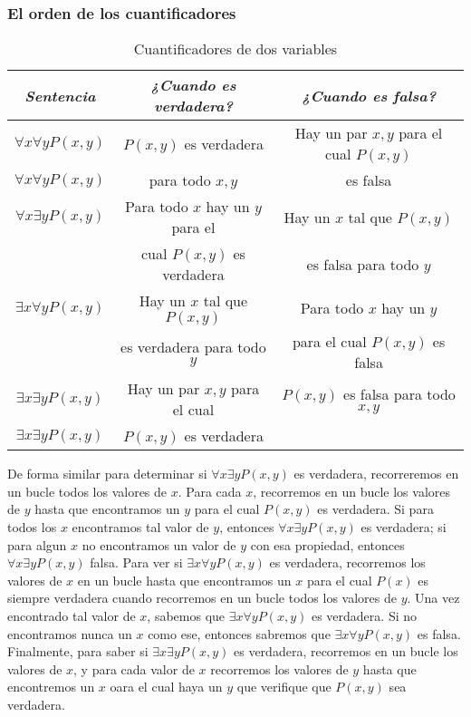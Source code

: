 \documentclass[]{article}
\begin{document}
\subsubsection{El orden de los cuantificadores}

\begin{table}[H]
	\caption*{Cuantificadores de dos variables}
	\begin{center}
		\begin{tabular}{|c|c|c|}
			\hline
			\textit{Sentencia} & \textit{¿Cuando es verdadera?} & \textit{¿Cuando es falsa?}\\
			\hline
			$\forall{x}\forall{y}P(x, y)$ & $P(x, y)$ es verdadera & Hay un par $x, y$ para el cual $P(x, y)$\\
			$\forall{x}\forall{y}P(x, y)$ & para todo $x, y$ & es falsa\\
			\hline
			$\forall{x}\exists{y}P(x, y)$ & Para todo $x$ hay un $y$ para el & Hay un $x$ tal que $P(x, y)$ \\
			 & cual $P(x, y)$ es verdadera & es falsa para todo $y$ \\
			\hline
			$\exists{x}\forall{y}P(x, y)$ & Hay un $x$ tal que $P(x, y)$ & Para todo $x$ hay un $y$ \\
			 & es verdadera para todo $y$ & para el cual  $P(x, y)$ es falsa \\
			\hline
			$\exists{x}\exists{y}P(x, y)$ & Hay un par $x, y$ para el cual & $P(x, y)$ es falsa para todo $x, y$\\
			$\exists{x}\exists{y}P(x, y)$ & $P(x, y)$ es verdadera &  \\
			\hline
		\end{tabular}
	\end{center}
\end{table}

De forma similar para determinar si $\forall{x}\exists{y}P(x, y)$ es verdadera, recorreremos en un bucle todos los valores de $x$. Para cada $x$, recorremos en un bucle los valores de $y$ hasta que encontramos un $y$ para el cual $P(x, y)$ es verdadera. Si para todos los $x$ encontramos tal valor de $y$, entonces $\forall{x}\exists{y}P(x, y)$ es verdadera; si para algun $x$ no encontramos un valor de $y$ con esa propiedad, entonces $\forall{x}\exists{y}P(x, y)$ falsa.
Para ver si $\exists{x}\forall{y}P(x, y)$ es verdadera, recorremos los valores de $x$ en un bucle hasta que encontramos un $x$ para el cual $P(x)$ es siempre verdadera cuando recorremos en un bucle todos los valores de $y$. Una vez encontrado tal valor de $x$, sabemos que $\exists{x}\forall{y}P(x, y)$ es verdadera. Si no encontramos nunca un $x$ como ese, entonces sabremos que $\exists{x}\forall{y}P(x, y)$ es falsa.
Finalmente, para saber si $\exists{x}\exists{y}P(x, y)$ es verdadera, recorremos en un bucle los valores de $x$, y para cada valor de $x$ recorremos los valores de $y$ hasta que encontremos un $x$ oara el cual haya un $y$ que verifique que $P(x, y)$ sea verdadera.
\end{document}
